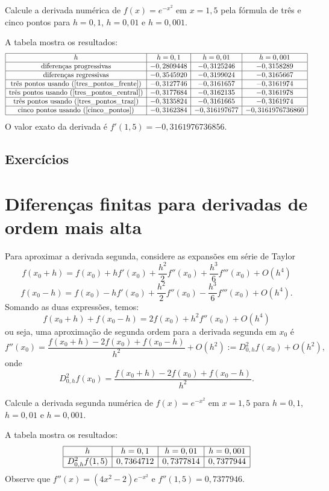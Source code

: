 \begin{ex}
Calcule a derivada numérica de $f(x)=e^{-x^2}$ em $x=1,5$ pela fórmula de três e cinco pontos para $h=0,1$, $h=0,01$ e $h=0,001$.
\end{ex}
\begin{sol}
A tabela mostra os resultados:
$$
\begin{array}{|c|c|c|c|}
\hline
 h & h=0,1 & h=0,01 & h=0,001\\
\hline
\hbox{diferenças progressivas} &-0,2809448 &-0,3125246 &- 0,3158289\\
\hline
\hbox{diferenças regressivas} &- 0,3545920 &- 0,3199024 &- 0,3165667\\
\hline
\hbox{três pontos usando (\ref{tres_pontos_frente})} &-0,3127746 &- 0,3161657 &-0,3161974\\
\hline
\hbox{três pontos usando (\ref{tres_pontos_central})} &- 0,3177684 &- 0,3162135 &-0,3161978\\
\hline
\hbox{três pontos usando (\ref{tres_pontos_traz})} &-0,3135824 &- 0,3161665 &-0,3161974\\
\hline
\hbox{cinco pontos usando (\ref{cinco_pontos})} &-0,3162384&-0,316197677 &-0,3161976736860\\
\hline
\end{array}
$$
O valor exato da derivada é $f'(1,5) = -0,3161976736856$.  
\end{sol}

\subsection*{Exercícios}

\emconstrucao

\section{Diferenças finitas para derivadas de ordem mais alta}

Para aproximar a derivada segunda, considere as expansões em série de Taylor
$$
f(x_0+h)=f(x_0)+hf'(x_0)+\frac{h^2}{2}f''(x_0)+\frac{h^3}{6}f'''(x_0)+O(h^4)
$$
$$
f(x_0-h)=f(x_0)-hf'(x_0)+\frac{h^2}{2}f''(x_0)-\frac{h^3}{6}f'''(x_0)+O(h^4).
$$
Somando as duas expressões, temos:
$$
f(x_0+h)+f(x_0-h)=2f(x_0)+h^2f''(x_0)+O(h^4)
$$
ou seja, uma aproximação de segunda ordem para a derivada segunda em $x_0$ é
$$
f''(x_0)=\frac{f(x_0+h)-2f(x_0)+f(x_0-h)}{h^2}+O(h^2):=D^2_{0,h}f(x_0)+O(h^2),
$$
onde
$$
D^2_{0,h}f(x_0)=\frac{f(x_0+h)-2f(x_0)+f(x_0-h)}{h^2}.
$$
\begin{ex}
Calcule a derivada segunda numérica de $f(x)=e^{-x^2}$ em $x=1,5$ para $h=0,1$, $h=0,01$ e $h=0,001$.
\end{ex}
\begin{sol}
A tabela mostra os resultados:
$$
\begin{array}{|c|c|c|c|}
\hline
 h&h=0,1& h=0,01 & h=0,001\\
\hline
D^2_{0,h}f(1,5) & 0,7364712 & 0,7377814 & 0,7377944\\
\hline
\end{array}
$$
Observe que $f''(x)=(4x^2-2)e^{-x^2}$ e $f''(1,5)=0,7377946$.  
\end{sol}

